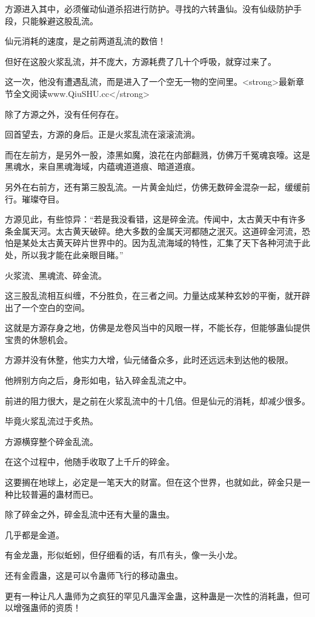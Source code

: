 \begin{this_body}
方源进入其中，必须催动仙道杀招进行防护。寻找的六转蛊仙。没有仙级防护手段，只能躲避这股乱流。

仙元消耗的速度，是之前两道乱流的数倍！

但好在这股火浆乱流，并不庞大，方源耗费了几十个呼吸，就穿过来了。

这一次，他没有遭遇乱流，而是进入了一个空无一物的空间里。<strong>最新章节全文阅读www.QiuSHU.cc</strong>

除了方源之外，没有任何存在。

回首望去，方源的身后。正是火浆乱流在滚滚流淌。

而在左前方，是另外一股，漆黑如魔，浪花在内部翻溅，仿佛万千冤魂哀嚎。这是黑魂水，来自黑魂海域，内蕴魂道道痕、暗道道痕。

另外在右前方，还有第三股乱流。一片黄金灿烂，仿佛无数碎金混杂一起，缓缓前行。璀璨夺目。

方源见此，有些惊异：“若是我没看错，这是碎金流。传闻中，太古黄天中有许多条金属天河。太古黄天破碎。绝大多数的金属天河都随之泯灭。这道碎金河流，恐怕是某处太古黄天碎片世界中的。因为乱流海域的特性，汇集了天下各种河流于此处，所以我才能在此亲眼目睹。”

火浆流、黑魂流、碎金流。

这三股乱流相互纠缠，不分胜负，在三者之间。力量达成某种玄妙的平衡，就开辟出了一个空白的空间。

这就是方源存身之地，仿佛是龙卷风当中的风眼一样，不能长存，但能够蛊仙提供宝贵的休憩机会。

方源并没有休整，他实力大增，仙元储备众多，此时还远远未到达他的极限。

他辨别方向之后，身形如电，钻入碎金乱流之中。

前进的阻力很大，是之前在火浆乱流中的十几倍。但是仙元的消耗，却减少很多。

毕竟火浆乱流过于炙热。

方源横穿整个碎金乱流。

在这个过程中，他随手收取了上千斤的碎金。

这要搁在地球上，必定是一笔天大的财富。但在这个世界，也就如此，碎金只是一种比较普遍的蛊材而已。

除了碎金之外，碎金乱流中还有大量的蛊虫。

几乎都是金道。

有金龙蛊，形似蚯蚓，但仔细看的话，有爪有头，像一头小龙。

还有金霞蛊，这是可以令蛊师飞行的移动蛊虫。

更有一种让凡人蛊师为之疯狂的罕见凡蛊浑金蛊，这种蛊是一次性的消耗蛊，但可以增强蛊师的资质！


\end{this_body}
